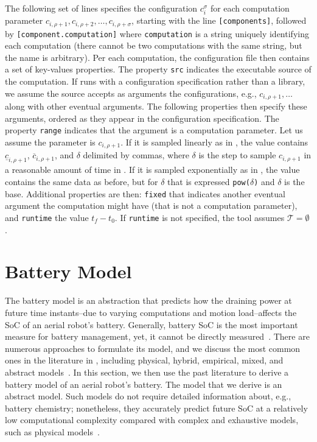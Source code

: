 The following set of lines specifies the configuration $c_i^\sigma$ for each computation parameter $c_{i,\rho+1},c_{i,\rho+2},\dots,c_{i,\rho+\sigma}$, starting with the line {\small\tt [components]}, followed by {\small\tt [component.computation]} where {\small\tt computation} is a string uniquely identifying each computation (there cannot be two computations with the same string, but the name is arbitrary). Per each computation, the configuration file then contains a set of key-values properties. The property {\small\tt src} indicates the executable source of the computation. If \powprof{} runs with a configuration specification rather than a library, we assume the source accepts as arguments the configurations, e.g., $c_{i,\rho+1},\dots$ along with other eventual arguments. The following properties then specify these arguments, ordered as they appear in the configuration specification. The property {\small\tt range} indicates that the argument is a computation parameter. Let us assume the parameter is $c_{i,\rho+1}$. If it is sampled linearly as in , the value contains $\underline{c}_{i,\rho+1}$, $\overline{c}_{i,\rho+1}$, and $\delta$ delimited by commas, where $\delta$ is the step to sample $c_{i,\rho+1}$ in a reasonable amount of time in . If it is sampled exponentially as in , the value contains the same data as before, but for $\delta$ that is expressed {\small\tt pow(}$\delta${\small\tt )} and $\delta$ is the base.
Additional properties are then: {\small\tt fixed} that indicates another eventual argument the computation might have (that is not a computation parameter), and {\small\tt runtime} the value $t_f-t_0$. If {\small\tt runtime} is not specified, the tool assumes $\mathcal{T}=\emptyset$.


\section{Battery Model}
\label{sec:battery-model}

The battery model is an abstraction that predicts how the draining power at future time instants--due to varying computations and motion load--affects the SoC of an aerial robot's battery. Generally, battery SoC is the most important measure for  battery management, yet, it cannot be directly measured~\citep{xia2015state}. There are numerous approaches to formulate its model, and we discuss the most common ones in the literature in , including physical, hybrid, empirical, mixed, and abstract models~\citep{rao2003battery}. In this section, we then use the past literature to derive a battery model of an aerial robot's battery. The model that we derive is an abstract model. Such models do not require detailed information about, e.g., battery chemistry; nonetheless, they accurately predict future SoC at a relatively low computational complexity compared with complex and exhaustive models, such as physical models~\citep{rao2003battery}.

